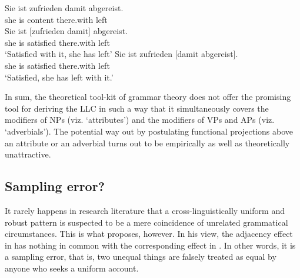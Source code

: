 \documentclass[output=paper
  ,nobabel
  ,uniformtopskip %
]{langscibook}
\begin{document}




\eal
\ex 
\gll Sie ist zufrieden damit abgereist.\\
     she is  content   there.with left\\
\ex 
\gll Sie ist [zufrieden damit] abgereist.\\
     she is  \spacebr{}satisfied there.with left \\
\glt `Satisfied with it, she has left'
\ex
\gll Sie ist zufrieden [damit abgereist].\\
     she is  satisfied \spacebr{}there.with left\\     
\glt `Satisfied, she has left with it.'
\zl

\noindent
In sum, the theoretical tool-kit of grammar theory does not offer the promising tool for deriving the LLC in such a way that it simultaneously covers the modifiers of NPs (viz. `attributes') and the modifiers of VPs and APs (viz. `adverbials'). The potential way out by postulating functional projections above an attribute or an adverbial turns out to be empirically as well as theoretically unattractive.

\subsection{Sampling error?}\label{subsec-error}

It rarely happens in research literature that a cross-linguistically uniform and robust pattern is suspected to be a mere coincidence of unrelated grammatical circumstances. This is what \citet{Hinterhoelzl2016} proposes, however. In his view, the adjacency effect in  has nothing in common with the corresponding effect in . In other words, it is a sampling error, that is, two unequal things are falsely treated as equal by anyone who seeks a uniform account.
\end{document}
